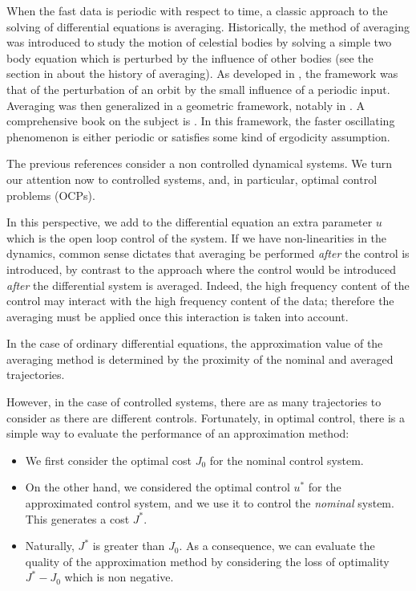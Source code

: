 \documentclass[a4paper,10pt]{article}
\begin{document}
When the fast data is periodic with respect to time, a classic 
approach to the solving of differential equations is averaging.
Historically, the method of averaging was introduced to study the 
motion of celestial bodies by solving a simple two body equation 
which is perturbed by the influence of other bodies (see the  
section in \cite{sanders} about the history of averaging). As 
developed in \cite{poincare}, the framework was that of the 
perturbation of an orbit by the small influence of a periodic input.
Averaging was then generalized in a geometric framework, notably in 
\cite{Arnold-celestial,ArnoldODE}. A comprehensive book on the subject
is \cite{sanders}. In this framework, the faster oscillating phenomenon is 
either periodic or satisfies some kind of ergodicity assumption.

The previous references consider a non controlled dynamical systems. 
We turn our attention now to controlled systems, and, in particular, 
optimal control problems (OCPs).

In this perspective, we add to the differential equation an extra parameter $u$ which is the open 
loop control of the system. If we have non-linearities in the 
dynamics, common sense dictates that averaging be performed {\em 
after} the control is introduced, by contrast to the approach where 
the control would be introduced {\em after} the differential system 
is averaged. Indeed, the high frequency content of the control may 
interact with the high frequency content of the data; therefore the 
averaging must be applied once this interaction is taken into account.

In the case of ordinary differential equations, the approximation value of the 
averaging method is determined by the proximity of the nominal and 
averaged trajectories.

However, in the case of controlled systems, there are as many trajectories to 
consider as there are different controls. Fortunately, in optimal 
control, there is a simple way to evaluate the performance of an approximation method:
\begin{itemize}
	\item  We first consider the optimal cost $J_{0}$ for the nominal 
	control system.

	\item  On the other hand, we considered the optimal control 
	$u^{*}$ for the approximated control system, and we use it to 
	control the {\em nominal} system. This generates a cost $J^{*}$.

	\item  Naturally, $J^{*}$ is greater than $J_{0}$. As a 
	consequence, we can evaluate the 
	quality of the approximation method by considering the loss of optimality
	$J^{*}-J_{0}$ which is non negative.
\end{itemize}
\end{document}
